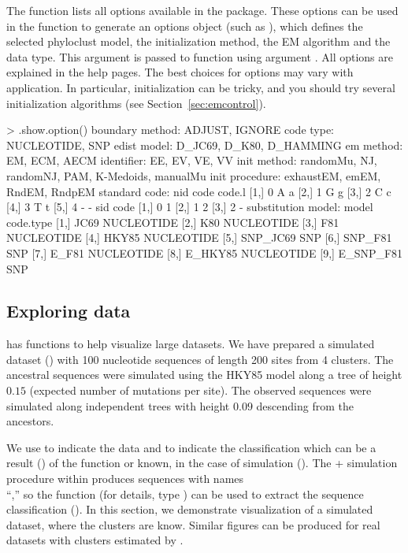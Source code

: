 The  function lists all options
available in the  package.
These options can be used in the  function
to generate an options object (such as ), which defines
the selected phyloclust model, the initialization method, the EM algorithm and
the data type.  This argument is passed to function  using argument .
All options are explained in the help pages.
The best choices for options may vary with application.
In particular, initialization can be tricky, and you should try
several initialization algorithms (see Section~\ref{sec:emcontrol}).
\begin{Code}
> .show.option()
boundary method: ADJUST, IGNORE
code type: NUCLEOTIDE, SNP
edist model: D_JC69, D_K80, D_HAMMING
em method: EM, ECM, AECM
identifier: EE, EV, VE, VV
init method: randomMu, NJ, randomNJ, PAM, K-Medoids, manualMu
init procedure: exhaustEM, emEM, RndEM, RndpEM
standard code: 
     nid code code.l
[1,]   0    A      a
[2,]   1    G      g
[3,]   2    C      c
[4,]   3    T      t
[5,]   4    -      -
     sid code
[1,]   0    1
[2,]   1    2
[3,]   2    -
substitution model: 
          model  code.type
 [1,]      JC69 NUCLEOTIDE
 [2,]       K80 NUCLEOTIDE
 [3,]       F81 NUCLEOTIDE
 [4,]     HKY85 NUCLEOTIDE
 [5,]  SNP_JC69        SNP
 [6,]   SNP_F81        SNP
 [7,]     E_F81 NUCLEOTIDE
 [8,]   E_HKY85 NUCLEOTIDE
 [9,] E_SNP_F81        SNP
\end{Code}




\subsection[Exploring data]{Exploring data}
\label{sec:illustrate}

 has functions to help visualize large datasets.
We have prepared a simulated dataset () with 100 nucleotide sequences of length 200 sites from 4 clusters.
The ancestral sequences were simulated using the HKY85 model \citep{Hasegawa1985} along a tree of height $0.15$ (expected number of mutations per site).
The observed sequences were simulated along independent trees with height $0.09$ descending from the ancestors.

We use  to indicate the data
and  to indicate the classification which can be
a result () of the  function
or known, in the case of simulation ().
The + simulation procedure within  produces 
sequences with names \\
``,'' so the 
function  (for details, type ) can be used
to extract the sequence classification ().
In this section, we demonstrate visualization of a simulated dataset, where
the clusters are know. 
Similar figures can be produced for real datasets with clusters estimated by .

